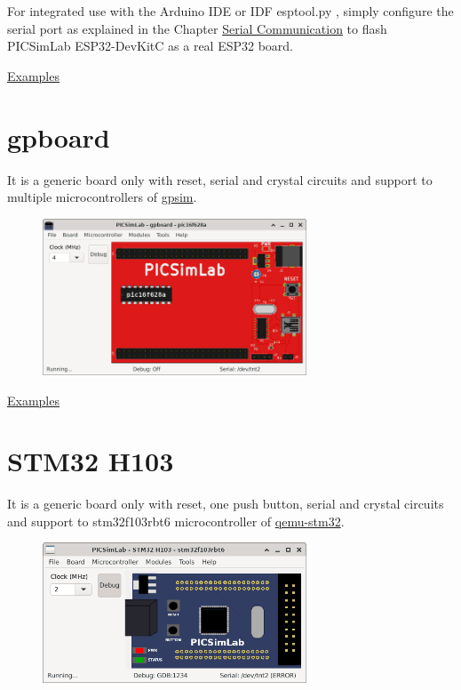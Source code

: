 For integrated use with the Arduino IDE or IDF esptool.py , simply configure the serial port as explained 
in the Chapter \hyperlink{def:seriali}{Serial Communication} to flash PICSimLab ESP32-DevKitC as a real ESP32 board.

\href{https://lcgamboa.github.io/picsimlab_examples/board_ESP32_DevKitC.html}{Examples}


\section{gpboard}

It is a generic board only with reset, serial and crystal circuits and support to multiple microcontrollers 
of \href{http://gpsim.sourceforge.net/}{gpsim}.

\begin{figure}[H]
\center
\includegraphics[width=0.7\textwidth]{img/gpboard.png} 
\end{figure} 

\href{https://lcgamboa.github.io/picsimlab_examples/board_gpboard.html}{Examples}


\section{STM32 H103}

It is a generic board only with reset, one push button, serial and crystal circuits and support to stm32f103rbt6 microcontroller of 
\href{https://beckus.github.io/qemu_stm32/}{qemu-stm32}.

\begin{figure}[H]
\center
\includegraphics[width=0.7\textwidth]{img/STM32_H103.png} 
\end{figure} 

